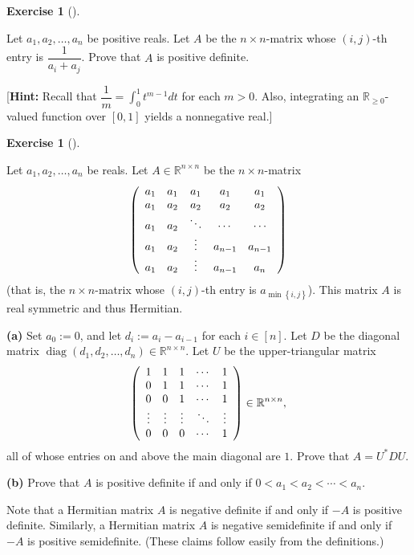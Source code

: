 \documentclass[numbers=enddot,12pt,final,onecolumn,notitlepage]{scrartcl}%
\newcounter{exer}
\numberwithin{exer}{subsection}
\theoremstyle{definition}
\newtheorem{exmp}[exer]{Exercise}
\newenvironment{exercise}[1][]
{\begin{exmp}[#1]\begin{leftbar}}
{\end{leftbar}\end{exmp}}
\begin{document}
\begin{exercise}
 Let $a_{1},a_{2},\ldots,a_{n}$ be positive reals. Let $A$ be the
$n\times n$-matrix whose $\left(  i,j\right)  $-th entry is $\dfrac{1}%
{a_{i}+a_{j}}$. Prove that $A$ is positive definite. \medskip

[\textbf{Hint:} Recall that $\dfrac{1}{m}=\int_{0}^{1}t^{m-1}dt$ for each
$m>0$. Also, integrating an $\mathbb{R}_{\geq0}$-valued function over $\left[
0,1\right]  $ yields a nonnegative real.]
\end{exercise}

\begin{exercise}
 Let $a_{1},a_{2},\ldots,a_{n}$ be reals. Let $A\in\mathbb{R}^{n\times
n}$ be the $n\times n$-matrix%
\[
\left(
\begin{array}
[c]{ccccc}%
a_{1} & a_{1} & a_{1} & a_{1} & a_{1}\\
a_{1} & a_{2} & a_{2} & a_{2} & a_{2}\\
a_{1} & a_{2} & \ddots & \cdots & \cdots\\
a_{1} & a_{2} & \vdots & a_{n-1} & a_{n-1}\\
a_{1} & a_{2} & \vdots & a_{n-1} & a_{n}%
\end{array}
\right)
\]
(that is, the $n\times n$-matrix whose $\left(  i,j\right)  $-th entry is
$a_{\min\left\{  i,j\right\}  }$). This matrix $A$ is real symmetric and thus
Hermitian. \medskip

\textbf{(a)} Set $a_{0}:=0$, and let $d_{i}:=a_{i}-a_{i-1}$ for each
$i\in\left[  n\right]  $. Let $D$ be the diagonal matrix $\operatorname*{diag}%
\left(  d_{1},d_{2},\ldots,d_{n}\right)  \in\mathbb{R}^{n\times n}$. Let $U$
be the upper-triangular matrix
\[
\left(
\begin{array}
[c]{ccccc}%
1 & 1 & 1 & \cdots & 1\\
0 & 1 & 1 & \cdots & 1\\
0 & 0 & 1 & \cdots & 1\\
\vdots & \vdots & \vdots & \ddots & \vdots\\
0 & 0 & 0 & \cdots & 1
\end{array}
\right)  \in\mathbb{R}^{n\times n},
\]
all of whose entries on and above the main diagonal are $1$. Prove that
$A=U^{\ast}DU$. \medskip

\textbf{(b)} Prove that $A$ is positive definite if and only if $0<a_{1}%
<a_{2}<\cdots<a_{n}$.
\end{exercise}

Note that a Hermitian matrix $A$ is negative definite if and only if $-A$ is
positive definite. Similarly, a Hermitian matrix $A$ is negative semidefinite
if and only if $-A$ is positive semidefinite. (These claims follow easily from
the definitions.)
\end{document}
